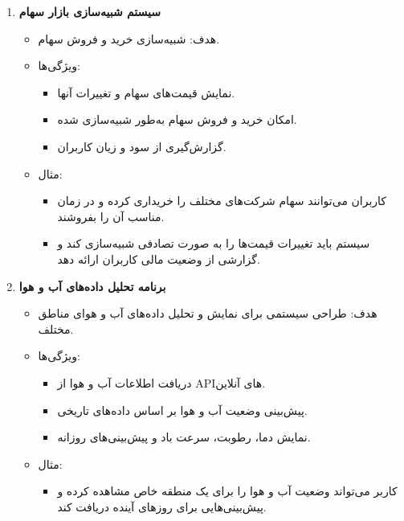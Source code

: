 \documentclass[a4paper,12pt]{article}
\begin{document}
\begin{enumerate}
			\item \textbf{سیستم شبیه‌سازی بازار سهام}
			\begin{itemize}
				\item هدف: شبیه‌سازی خرید و فروش سهام.
				\item ویژگی‌ها:
				\begin{itemize}
					\item نمایش قیمت‌های سهام و تغییرات آنها.
					\item امکان خرید و فروش سهام به‌طور شبیه‌سازی شده.
					\item گزارش‌گیری از سود و زیان کاربران.
				\end{itemize}
				\item مثال:
				\begin{itemize}
					\item کاربران می‌توانند سهام شرکت‌های مختلف را خریداری کرده و در زمان مناسب آن را بفروشند.
					\item سیستم باید تغییرات قیمت‌ها را به صورت تصادفی شبیه‌سازی کند و گزارشی از وضعیت مالی کاربران ارائه دهد.
				\end{itemize}
			\end{itemize}
			
			\item \textbf{برنامه تحلیل داده‌های آب و هوا}
			\begin{itemize}
				\item هدف: طراحی سیستمی برای نمایش و تحلیل داده‌های آب و هوای مناطق مختلف.
				\item ویژگی‌ها:
				\begin{itemize}
					\item دریافت اطلاعات آب و هوا از APIهای آنلاین.
					\item پیش‌بینی وضعیت آب و هوا بر اساس داده‌های تاریخی.
					\item نمایش دما، رطوبت، سرعت باد و پیش‌بینی‌های روزانه.
				\end{itemize}
				\item مثال:
				\begin{itemize}
					\item کاربر می‌تواند وضعیت آب و هوا را برای یک منطقه خاص مشاهده کرده و پیش‌بینی‌هایی برای روزهای آینده دریافت کند.
				\end{itemize}
			\end{itemize}
			

\end{enumerate}
\end{document}
